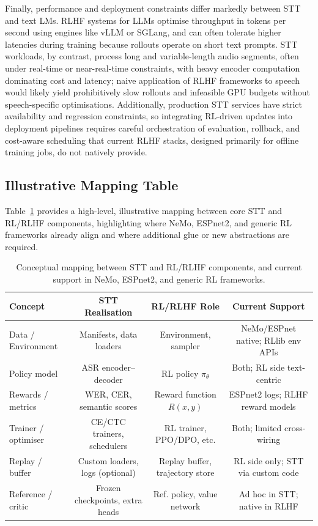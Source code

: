\documentclass[conference]{IEEEtran}
\begin{document}
Finally, performance and deployment constraints differ markedly between STT and text LMs.
RLHF systems for LLMs optimise throughput in tokens per second using engines like vLLM or SGLang, and can often tolerate higher latencies during training because rollouts operate on short text prompts.
STT workloads, by contrast, process long and variable-length audio segments, often under real-time or near-real-time constraints, with heavy encoder computation dominating cost and latency; naive application of RLHF frameworks to speech would likely yield prohibitively slow rollouts and infeasible GPU budgets without speech-specific optimisations.
Additionally, production STT services have strict availability and regression constraints, so integrating RL-driven updates into deployment pipelines requires careful orchestration of evaluation, rollback, and cost-aware scheduling that current RLHF stacks, designed primarily for offline training jobs, do not natively provide.

\subsection{Illustrative Mapping Table}

Table~\ref{tab:cross-mapping} provides a high-level, illustrative mapping between core STT and RL/RLHF components, highlighting where NeMo, ESPnet2, and generic RL frameworks already align and where additional glue or new abstractions are required.

\begin{table}[t]
\centering
\caption{Conceptual mapping between STT and RL/RLHF components, and current support in NeMo, ESPnet2, and generic RL frameworks.}
\begin{tabular}{lccc}
\toprule
Concept & STT Realisation & RL/RLHF Role & Current Support \\
\midrule
Data / Environment &
Manifests, data loaders &
Environment, sampler &
NeMo/ESPnet native; RLlib env APIs \\
Policy model &
ASR encoder--decoder &
RL policy $\pi_\theta$ &
Both; RL side text-centric \\
Rewards / metrics &
WER, CER, semantic scores &
Reward function $R(x, y)$ &
ESPnet2 logs; RLHF reward models \\
Trainer / optimiser &
CE/CTC trainers, schedulers &
RL trainer, PPO/DPO, etc. &
Both; limited cross-wiring \\
Replay / buffer &
Custom loaders, logs (optional) &
Replay buffer, trajectory store &
RL side only; STT via custom code \\
Reference / critic &
Frozen checkpoints, extra heads &
Ref. policy, value network &
Ad hoc in STT; native in RLHF \\
\bottomrule
\end{tabular}
\label{tab:cross-mapping}
\end{table}
\end{document}
